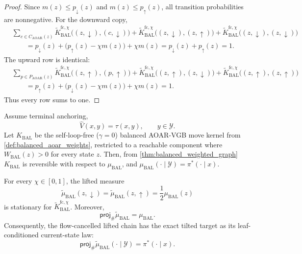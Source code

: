 \documentclass{article}
\numberwithin{theorem}{section}
\numberwithin{proposition}{section}
\numberwithin{corollary}{section}
\numberwithin{lemma}{section}
\numberwithin{conjecture}{section}
\numberwithin{remark}{section}
\numberwithin{definition}{section}
\numberwithin{assumption}{section}
\numberwithin{example}{section}
\newcommand{\calY}{{\mathcal{Y}}}
\begin{document}
\begin{proof}
Since $m(z)\le p_{\downarrow}(z)$ and $m(z)\le p_{\uparrow}(z)$, all transition probabilities are nonnegative. For the downward copy,
\begin{align*}
    &\sum_{c\in C_{\mathrm{AOAR}}(z)}
    \widetilde K_{\mathrm{BAL}}^{\mathrm{fc},\chi}\bigl((z,\downarrow),(c,\downarrow)\bigr)
    +\widetilde K_{\mathrm{BAL}}^{\mathrm{fc},\chi}\bigl((z,\downarrow),(z,\uparrow)\bigr)
    +\widetilde K_{\mathrm{BAL}}^{\mathrm{fc},\chi}\bigl((z,\downarrow),(z,\downarrow)\bigr)\\
    &\qquad=
    p_{\downarrow}(z)+\bigl(p_{\uparrow}(z)-\chi m(z)\bigr)+\chi m(z)
    =
    p_{\downarrow}(z)+p_{\uparrow}(z)=1.
\end{align*}
The upward row is identical:
\begin{align*}
    &\sum_{p\in P_{\mathrm{AOAR}}(z)}
    \widetilde K_{\mathrm{BAL}}^{\mathrm{fc},\chi}\bigl((z,\uparrow),(p,\uparrow)\bigr)
    +\widetilde K_{\mathrm{BAL}}^{\mathrm{fc},\chi}\bigl((z,\uparrow),(z,\downarrow)\bigr)
    +\widetilde K_{\mathrm{BAL}}^{\mathrm{fc},\chi}\bigl((z,\uparrow),(z,\uparrow)\bigr)\\
    &\qquad=
    p_{\uparrow}(z)+\bigl(p_{\downarrow}(z)-\chi m(z)\bigr)+\chi m(z)=1.
\end{align*}
Thus every row sums to one.
\end{proof}

\begin{theorem}
\label{thm:flow_cancelled_stationary}
Assume terminal anchoring,
\begin{equation*}
    \widehat V(x,y)=\tau(x,y), \qquad y\in\calY.
\end{equation*}
Let $K_{\mathrm{BAL}}$ be the self-loop-free ($\gamma=0$) balanced AOAR-VGB move kernel from \cref{def:balanced_aoar_weights}, restricted to a reachable component where $W_{\mathrm{BAL}}(z)>0$ for every state $z$. Then, from \cref{thm:balanced_weighted_graph} $K_{\mathrm{BAL}}$ is reversible with respect to $\mu_{\mathrm{BAL}}$, and $\mu_{\mathrm{BAL}}(\cdot\mid\calY)=\pi^*(\cdot\mid x)$.

For every $\chi\in[0,1]$, the lifted measure
\begin{equation*}
    \widetilde\mu_{\mathrm{BAL}}(z,\downarrow)=\widetilde\mu_{\mathrm{BAL}}(z,\uparrow)=\frac12\mu_{\mathrm{BAL}}(z)
\end{equation*}
is stationary for $\widetilde K_{\mathrm{BAL}}^{\mathrm{fc},\chi}$. Moreover,
\begin{equation*}
    \textsf{proj}_{\#}\widetilde\mu_{\mathrm{BAL}}=\mu_{\mathrm{BAL}}.
\end{equation*}
Consequently, the flow-cancelled lifted chain has the exact tilted target as its leaf-conditioned current-state law:
\begin{equation*}
    \textsf{proj}_{\#}\widetilde\mu_{\mathrm{BAL}}(\cdot\mid\calY)=\pi^*(\cdot\mid x).
\end{equation*}
\end{theorem}
\end{document}
